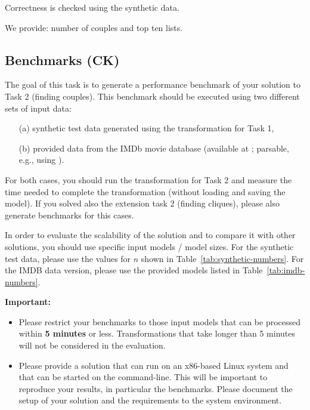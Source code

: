 \documentclass[a4paper,11pt]{article}
\begin{document}
Correctness is checked using the synthetic data.

We provide: number of couples and top ten lists.

\subsection{Benchmarks (CK)}

The goal of this task is to generate a performance benchmark
of your solution to Task 2 (finding couples). This benchmark should be
executed using two different sets of input data:
\begin{enumerate}
\item[(a)] synthetic test data generated using the transformation for Task 1, 
\item[(b)] provided data from the IMDb movie database (available at \cite{IMDBDATA}; parsable, e.g., using \cite{IMDB2EMF}).
\end{enumerate}
For both cases, you should run the transformation for Task 2 
and measure the time needed to complete the transformation 
(without loading and saving the model).
If you solved also the extension task 2 (finding cliques), please also generate benchmarks
for this cases.


In order to evaluate the scalability of the solution and to compare it with other solutions,
you should use specific input models / model sizes. For the synthetic test data, please use
the values for $n$ shown in Table~\ref{tab:synthetic-numbers}. For the IMDB data version,
please use the provided models listed in Table~\ref{tab:imdb-numbers}.


\noindent
\textbf{Important:}
\begin{itemize}
\item Please restrict your benchmarks to those input models that can be
processed within \textbf{5 minutes} or less. Transformations that take longer than 5 minutes
will not be considered in the evaluation.
\item Please provide a solution that can run on an x86-based Linux system and that can be started
on the command-line. This will be important to reproduce your results, in particular the benchmarks.
Please document the setup of your solution and the requirements to the system environment.
\end{itemize}
\end{document}
